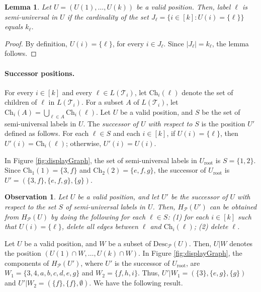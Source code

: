 \documentclass[11pt]{article}
\newcommand{\Ch}{\Children}
\newcommand{\Children}{\ensuremath{{\mathrm{Ch}}}}
\newcommand{\Uinit}{\ensuremath{U_\mathrm{root}}} \newcommand{\Ubef}{\ensuremath{U_\mathrm{bef}}} \newcommand{\Uaft}{\ensuremath{U_\mathrm{aft}}} \newcommand{\Urem}{\ensuremath{U_\mathrm{rem}}} \newcommand{\Yinit}{\ensuremath{Y_\mathrm{root}}} \newcommand{\Winit}{\ensuremath{W_\mathrm{root}}} \newcommand{\indeg}{\ensuremath{\mathrm{indegree}}} \newcommand{\Desc}{\ensuremath{\mathrm{Desc}}}
\newcommand{\DG}{\ensuremath{H_\P}} \newcommand{\GBNT}{\ensuremath{G_{\mathtt{BNT}}}}
\renewcommand{\P}{\ensuremath{\mathcal{P}}}
\newcommand{\T}{\ensuremath{\mathcal{T}}}
\newtheorem{lemma}{Lemma}
\newtheorem{observation}{Observation}
\theoremstyle{definition}
\begin{document}
\begin{lemma}\label{lem:semiU}
Let $U = (U(1), \dots , U(k))$ be a valid position.  Then, label $\ell$ is semi-universal in $U$ if the cardinality of the set $J_\ell = \{i \in [k] : U(i) = \{\ell\}\}$ equals $k_\ell$.
\end{lemma}
\begin{proof}
By definition, $U(i) = \{\ell\}$, for every $i \in J_\ell$. Since $|J_\ell| = k_\ell$, the lemma follows.
\end{proof}

\vspace{-1.5\parsep}

\paragraph{Successor positions.} 
For every $i \in [k]$ and every $\ell \in L(\T_i)$, let $\Ch_i(\ell)$ denote the set of children of $\ell$ in $L(\T_i)$.  For a subset $A$ of $L(\T_i)$, let $\Ch_i(A) = \bigcup_{\ell \in A} \Ch_i(\ell)$.  
Let $U$ be a valid position, and $S$ be the set of semi-universal labels in $U$.  The \emph{successor of $U$ with respect to $S$} is the position $U'$ defined as follows.  For each $\ell \in S$ and each $i \in [k]$, if $U(i) = \{\ell\}$, then $U'(i) = \Ch_i(\ell)$; otherwise, $U'(i) = U(i)$.  

In Figure \ref{fig:displayGraph}, the set of semi-universal labels in $\Uinit$ is $S = \{1, 2\}$.  Since $\Ch_1(1) = \{3,f\}$ and $\Ch_2(2) = \{e,f,g\}$, the successor of $\Uinit$ is $U'  = (\{3,f\}, \{e,f,g\}, \{g\})$.

\begin{observation}\label{obs:update2}
Let $U$ be a valid position, and let $U'$ be the successor of $U$ with respect to the set $S$ of semi-universal labels in $U$.  Then, $\DG(U')$ can be obtained from $\DG(U)$ by doing the following for each $\ell \in S$: (1) for each $i \in [k]$ such that $U(i) = \{\ell\}$, delete all edges between $\ell$ and $\Ch_i(\ell)$; (2) delete $\ell$.
\end{observation}

Let $U$ be a valid position, and $W$ be a subset of $\Desc_\P(U)$.  Then, $U | W$ denotes the position $(U(1) \cap W, \dots , U(k) \cap W)$.
In Figure \ref{fig:displayGraph}, the components of $\DG(U')$, where $U'$ is the successor of $\Uinit$, are $W_1 = \{3,4,a,b,c,d,e,g\}$ and $W_2 = \{f,h,i\}$.  Thus, $U' | W_1 = (\{3\}, \{e,g\}, \{g\})$ and $U' | W_2 = (\{f\}, \{f\}, \emptyset)$.  We have the following result.
\end{document}
